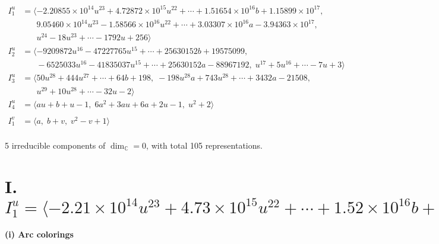 \documentclass[1p]{elsarticle_modified}
\theoremstyle{definition}
\begin{document}
\begin{align*}
I^u_{1}&=\langle 
-2.20855\times10^{14} u^{23}+4.72872\times10^{15} u^{22}+\cdots+1.51654\times10^{16} b+1.15899\times10^{17},\\
\phantom{I^u_{1}}&\phantom{= \langle  }9.05460\times10^{14} u^{23}-1.58566\times10^{16} u^{22}+\cdots+3.03307\times10^{16} a-3.94363\times10^{17},\\
\phantom{I^u_{1}}&\phantom{= \langle  }u^{24}-18 u^{23}+\cdots-1792 u+256\rangle \\
I^u_{2}&=\langle 
-9209872 u^{16}-47227765 u^{15}+\cdots+25630152 b+19575099,\\
\phantom{I^u_{2}}&\phantom{= \langle  }-6525033 u^{16}-41835037 u^{15}+\cdots+25630152 a-88967192,\;u^{17}+5 u^{16}+\cdots-7 u+3\rangle \\
I^u_{3}&=\langle 
50 u^{28}+444 u^{27}+\cdots+64 b+198,\;-198 u^{28} a+743 u^{28}+\cdots+3432 a-21508,\\
\phantom{I^u_{3}}&\phantom{= \langle  }u^{29}+10 u^{28}+\cdots-32 u-2\rangle \\
I^u_{4}&=\langle 
a u+b+u-1,\;6 a^2+3 a u+6 a+2 u-1,\;u^2+2\rangle \\
\\
I^v_{1}&=\langle 
a,\;b+v,\;v^2- v+1\rangle \\
\end{align*}
\raggedright * 5 irreducible components of $\dim_{\mathbb{C}}=0$, with total 105 representations.\\
\newpage
\renewcommand{\arraystretch}{1}
\centering \section*{I. $I^u_{1}= \langle -2.21\times10^{14} u^{23}+4.73\times10^{15} u^{22}+\cdots+1.52\times10^{16} b+1.16\times10^{17},\;9.05\times10^{14} u^{23}-1.59\times10^{16} u^{22}+\cdots+3.03\times10^{16} a-3.94\times10^{17},\;u^{24}-18 u^{23}+\cdots-1792 u+256 \rangle$}
\flushleft \textbf{(i) Arc colorings}\\
\end{document}

